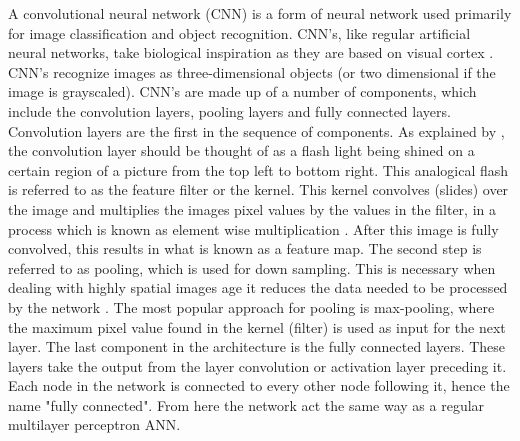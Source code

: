 A convolutional neural network (CNN) is a form of neural network used primarily for image classification and object recognition. CNN's, like regular artificial neural networks, take biological inspiration as they are based on visual cortex \citep{adit}. CNN's recognize images as three-dimensional objects (or two dimensional if the image is grayscaled). CNN's are made up of a number of components, which include the convolution layers, pooling layers and fully connected layers. Convolution layers are the first in the sequence of components. As explained by \citeauthor{adit}, the convolution layer should be thought of as a flash light being shined on a certain region of a picture from the top left to bottom right. This analogical flash is referred to as the feature filter or the kernel. This kernel convolves (slides) over the image and multiplies the images pixel values by the values in the filter, in a process which is known as element wise multiplication \citep{adit}. After this image is fully convolved, this results in what is known as a feature map. The second step is referred to as pooling, which is used for down sampling. This is necessary when dealing with highly spatial images age it reduces the data needed to be processed by the network \citep{kar}. The most popular approach for pooling is max-pooling, where the maximum pixel value found in the kernel (filter) is used as input for the next layer. The last component in the architecture is the fully connected layers. These layers take the output from the layer convolution or activation layer preceding it. Each node in the network is connected to every other node following it, hence the name "fully connected". From here the network act the same way as a regular multilayer perceptron ANN.




